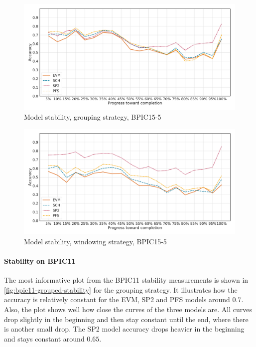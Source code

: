 \begin{figure}[!htb]
    \centering
    \includegraphics[width=\textwidth]{gfx/bpic2015_5/grouped_stability.pdf}
    \caption{Model stability, grouping strategy, BPIC15-5}
    \label{fig:bpic15-5-grouped-stability}
\end{figure}
\begin{figure}[!htb]
    \centering
    \includegraphics[width=\textwidth]{gfx/bpic2015_5/windowed_stability.pdf}
    \caption{Model stability, windowing strategy, BPIC15-5}
    \label{fig:bpic15-5-windowed-stability}
\end{figure}
\newpage

\paragraph{Stability on BPIC11}
The most informative plot from the BPIC11 stability measurements is shown in \autoref{fig:bpic11-grouped-stability} for the grouping strategy.
It illustrates how the accuracy is relatively constant for the EVM, SP2 and PFS models around $0.7$.
Also, the plot shows well how close the curves of the three models are.
All curves drop slightly in the beginning and then stay constant until the end, where there is another small drop.
The SP2 model accuracy drops heavier in the beginning and stays constant around $0.65$.

